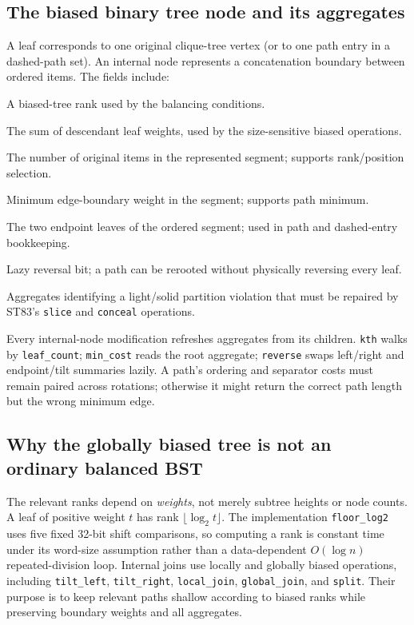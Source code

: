 \subsection{The biased binary tree node and its aggregates}
A leaf corresponds to one original clique-tree vertex (or to one path entry in a dashed-path set).  An internal node represents a concatenation boundary between ordered items.  The fields include:
\begin{description}[leftmargin=3cm,style=nextline]
\item[\texttt{rank}] A biased-tree rank used by the balancing conditions.
\item[\texttt{sum\_weight}] The sum of descendant leaf weights, used by the size-sensitive biased operations.
\item[\texttt{leaf\_count}] The number of original items in the represented segment; supports rank/position selection.
\item[\texttt{minimum\_cost}] Minimum edge-boundary weight in the segment; supports path minimum.
\item[\texttt{first}, \texttt{last}] The two endpoint leaves of the ordered segment; used in path and dashed-entry bookkeeping.
\item[\texttt{reversed}] Lazy reversal bit; a path can be rerooted without physically reversing every leaf.
\item[tilt minima] Aggregates identifying a light/solid partition violation that must be repaired by ST83's \texttt{slice} and \texttt{conceal} operations.
\end{description}
Every internal-node modification refreshes aggregates from its children.  \texttt{kth} walks by \texttt{leaf\_count}; \texttt{min\_cost} reads the root aggregate; \texttt{reverse} swaps left/right and endpoint/tilt summaries lazily.  A path's ordering and separator costs must remain paired across rotations; otherwise it might return the correct path length but the wrong minimum edge.

\subsection{Why the globally biased tree is not an ordinary balanced BST}
The relevant ranks depend on \emph{weights}, not merely subtree heights or node counts.  A leaf of positive weight \(t\) has rank \(\lfloor\log_2 t\rfloor\).  The implementation \texttt{floor\_log2} uses five fixed 32-bit shift comparisons, so computing a rank is constant time under its word-size assumption rather than a data-dependent \(O(\log n)\) repeated-division loop.  Internal joins use locally and globally biased operations, including \texttt{tilt\_left}, \texttt{tilt\_right}, \texttt{local\_join}, \texttt{global\_join}, and \texttt{split}.  Their purpose is to keep relevant paths shallow according to biased ranks while preserving boundary weights and all aggregates.

